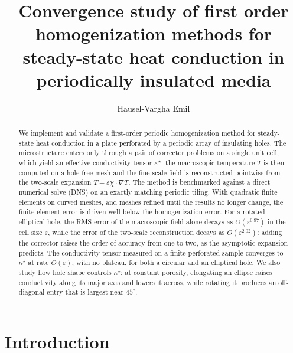 \documentclass{article}
\begin{document}
\title{Convergence study of first order homogenization methods for
steady-state heat conduction in periodically insulated media}

\author{ Hausel-Vargha Emil}

\maketitle

\begin{abstract}
We implement and validate a first-order periodic homogenization method for
steady-state heat conduction in a plate perforated by a periodic array of
insulating holes. The microstructure enters only through a pair of corrector
problems on a single unit cell, which yield an effective conductivity tensor
$\kappa^{\star}$; the macroscopic temperature $T$ is then computed on a hole-free
mesh and the fine-scale field is reconstructed pointwise from the two-scale
expansion $T+\varepsilon\chi\cdot\nabla T$. The method is benchmarked against a
direct numerical solve (DNS) on an exactly matching periodic tiling. With
quadratic finite elements on curved meshes, and meshes refined until the
results no longer change, the finite element error is driven well below the
homogenization error. For a rotated elliptical hole, the RMS error of the
macroscopic field alone decays as $O(\varepsilon^{0.97})$ in the cell size
$\varepsilon$, while the error of the two-scale reconstruction decays as
$O(\varepsilon^{2.02})$: adding the corrector raises the order of accuracy from one
to two, as the asymptotic expansion predicts. The conductivity tensor measured
on a finite perforated sample converges to $\kappa^{\star}$ at rate
$O(\varepsilon)$, with no plateau, for both a circular and an elliptical hole. We
also study how hole shape controls $\kappa^{\star}$: at constant porosity,
elongating an ellipse raises conductivity along its major axis and lowers it
across, while rotating it produces an off-diagonal entry that is largest near
$45^{\circ}$.
\end{abstract}

\clearpage
\tableofcontents
\clearpage

\section{Introduction}
\end{document}
